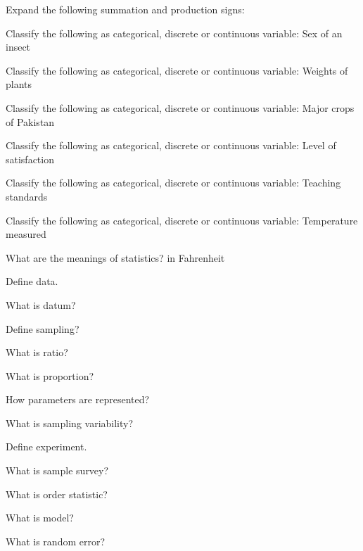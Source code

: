 \documentclass[11pt,a4paper]{article}
\begin{document}
\begin{shortlist}
\item Expand the following summation and production signs:

\item Classify the following as categorical, discrete or continuous variable: Sex of an insect

\item Classify the following as categorical, discrete or continuous variable: Weights of plants

\item Classify the following as categorical, discrete or continuous variable: Major crops of Pakistan

\item Classify the following as categorical, discrete or continuous variable: Level of satisfaction

\item Classify the following as categorical, discrete or continuous variable: Teaching standards

\item Classify the following as categorical, discrete or continuous variable: Temperature measured

\item What are the meanings of statistics? in Fahrenheit

\item Define data.

\item What is datum?

\item Define sampling?

\item What is ratio?

\item What is proportion?

\item How parameters are represented?

\item What is sampling variability?

\item Define experiment.

\item What is sample survey?

\item What is order statistic?

\item What is model?

\item What is random error?


\end{shortlist}
\end{document}

